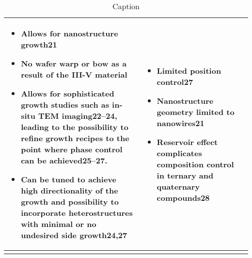 \begin{sidewaystable}
\begin{longtable}{p{}|p{}|p{}}
\begin{itemize}
        \item Allows for nanostructure growth21
        \item No wafer warp or bow as a result of the  III-V material
        \item Allows for sophisticated growth studies such as in-situ TEM imaging22–24, leading to the possibility to refine growth recipes to the point where phase control can be achieved25–27.
        \item Can be tuned to achieve high directionality of the growth and possibility to incorporate heterostructures with minimal or no undesired side growth24,27
    \end{itemize}  & \begin{itemize}
        \item Limited position control27
        \item Nanostructure geometry limited to nanowires21
        \item Reservoir effect complicates composition control in ternary and quaternary compounds28
    \end{itemize} \\ \hline
    \caption{Caption}
    \label{tab:methods1}
\end{longtable}
\end{sidewaystable}
